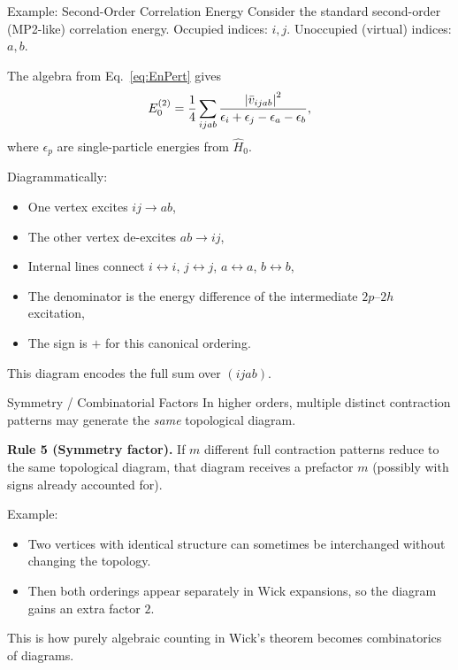 \documentclass[aspectratio=169]{beamer}
\begin{document}
\begin{frame}{Example: Second-Order Correlation Energy}
Consider the standard second-order (MP2-like) correlation energy.
Occupied indices: $i,j$.
Unoccupied (virtual) indices: $a,b$.

The algebra from Eq.~\eqref{eq:EnPert} gives
\begin{equation}
E_0^{(2)} =
\frac{1}{4}
\sum_{ijab}
\frac{
\abs{ \bar{v}_{ijab} }^2
}{
\epsilon_i + \epsilon_j - \epsilon_a - \epsilon_b
},
\end{equation}
where $\epsilon_p$ are single-particle energies from $\hat{H}_0$.

\bigskip
Diagrammatically:
\begin{itemize}
    \item One vertex excites $ij \to ab$,
    \item The other vertex de-excites $ab \to ij$,
    \item Internal lines connect $i\leftrightarrow i$, $j\leftrightarrow j$,
    $a\leftrightarrow a$, $b\leftrightarrow b$,
    \item The denominator is the energy difference of the intermediate
    $2p$--$2h$ excitation,
    \item The sign is $+$ for this canonical ordering.
\end{itemize}
This diagram encodes the full sum over $(ijab)$.
\end{frame}

\begin{frame}{Symmetry / Combinatorial Factors}
In higher orders, multiple distinct contraction patterns may generate
the \emph{same} topological diagram.

\textbf{Rule 5 (Symmetry factor).}
If $m$ different full contraction patterns reduce to the same
topological diagram, that diagram receives a prefactor $m$ (possibly
with signs already accounted for).

Example:
\begin{itemize}
    \item Two vertices with identical structure can sometimes be interchanged
    without changing the topology.
    \item Then both orderings appear separately in Wick expansions,
    so the diagram gains an extra factor $2$.
\end{itemize}

This is how purely algebraic counting in Wick's theorem becomes
combinatorics of diagrams.
\end{frame}
\end{document}
